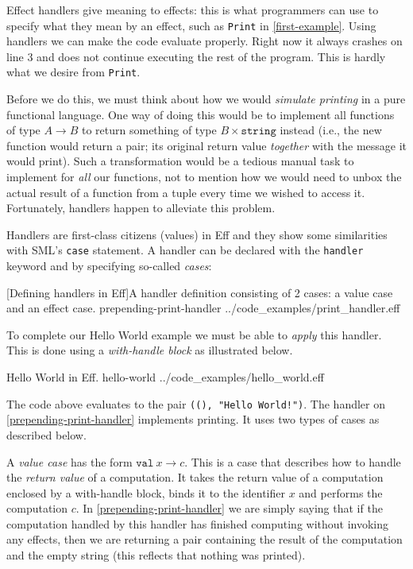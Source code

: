 \documentclass[class=article, crop=false]{standalone}
\begin{document}
Effect handlers give meaning to effects: this is what programmers can use to
specify what they mean by an effect, such as \lstinline{Print} in
\autoref{first-example}. Using handlers we can make the code evaluate properly.
Right now it always crashes on line 3 and does not continue executing the rest
of the program. This is hardly what we desire from \lstinline{Print}.

Before we do this, we must think about how we would \emph{simulate printing} in
a pure functional language. One way of doing this would be to implement all
functions of type $A \to B$ to return something of type $B \times \mathtt{string}$
instead (i.e., the new function would return a pair; its original return value
\emph{together} with the message it would print). Such a transformation would be
a tedious manual task to implement for \emph{all} our functions, not to mention
how we would need to unbox the actual result of a function from a tuple every
time we wished to access it. Fortunately, handlers happen to alleviate this
problem.

Handlers are first-class citizens (values) in Eff and they show some similarities
with SML's \lstinline|case| statement. A handler can be declared with the
\lstinline|handler| keyword and by specifying so-called \emph{cases}:

{[Defining handlers in Eff]A handler definition consisting of 2 cases: a value case and an effect case.}
{prepending-print-handler}
{../code_examples/print_handler.eff}

To complete our Hello World example we must be able to \emph{apply} this handler.
This is done using a \emph{with-handle block} as illustrated below.

{Hello World in Eff.}
{hello-world}
{../code_examples/hello_world.eff}

The code above evaluates to the pair \texttt{((), "Hello World!")}. The handler
on \autoref{prepending-print-handler} implements printing. It uses two types of
cases as described below.

A \emph{value case} has the form $\mathtt{val}\ x \to c$. This is a case that
describes how to handle the \emph{return value} of a computation. It takes the
return value of a computation enclosed by a with-handle block, binds it to the
identifier $x$ and performs the computation $c$. In \autoref{prepending-print-handler}
we are simply saying that if the computation handled by this handler has finished
computing without invoking any effects, then we are returning a pair containing
the result of the computation and the empty string (this reflects that nothing
was printed).
\end{document}
